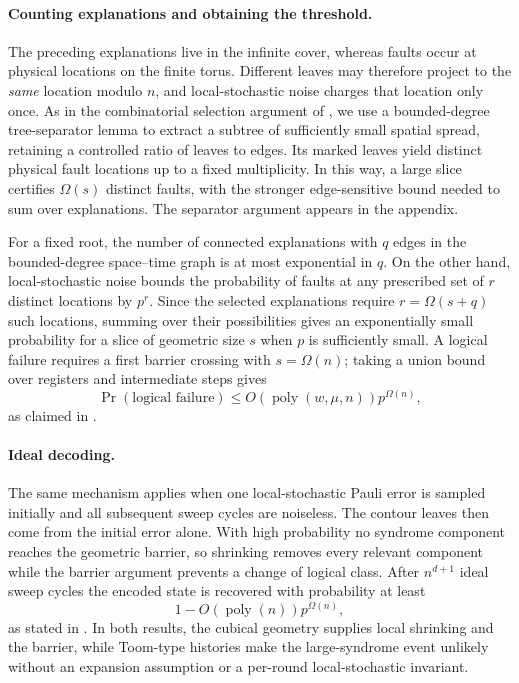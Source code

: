\paragraph{Counting explanations and obtaining the threshold.}
The preceding explanations live in the infinite cover, whereas faults occur at physical locations on the finite torus. Different leaves may therefore project to the \emph{same} location modulo $n$, and local-stochastic noise charges that location only once. As in the combinatorial selection argument of \cite{Berman}, we use a bounded-degree tree-separator lemma to extract a subtree of sufficiently small spatial spread, retaining a controlled ratio of leaves to edges. Its marked leaves yield distinct physical fault locations up to a fixed multiplicity. In this way, a large slice certifies $\Omega(s)$ distinct faults, with the stronger edge-sensitive bound needed to sum over explanations. The separator argument appears in the appendix.

For a fixed root, the number of connected explanations with $q$ edges in the bounded-degree space--time graph is at most exponential in $q$. On the other hand, local-stochastic noise bounds the probability of faults at any prescribed set of $r$ distinct locations by $p^r$. Since the selected explanations require $r=\Omega(s+q)$ such locations, summing over their possibilities gives an exponentially small probability for a slice of geometric size $s$ when $p$ is sufficiently small. A logical failure requires a first barrier crossing with $s=\Omega(n)$; taking a union bound over registers and intermediate steps gives
\begin{equation*}
  \Pr(\text{logical failure})
   \leq O\!\left(\operatorname{poly}(w,\mu,n)\right)p^{\Omega(n)},
\end{equation*}
as claimed in .

\paragraph{Ideal decoding.}
The same mechanism applies when one local-stochastic Pauli error is sampled initially and all subsequent sweep cycles are noiseless. The contour leaves then come from the initial error alone. With high probability no syndrome component reaches the geometric barrier, so shrinking removes every relevant component while the barrier argument prevents a change of logical class. After $n^{d+1}$ ideal sweep cycles the encoded state is recovered with probability at least
\begin{equation*}
  1-O\!\left(\operatorname{poly}(n)\right)p^{\Omega(n)},
\end{equation*}
as stated in . In both results, the cubical geometry supplies local shrinking and the barrier, while Toom-type histories make the large-syndrome event unlikely without an expansion assumption or a per-round local-stochastic invariant.
